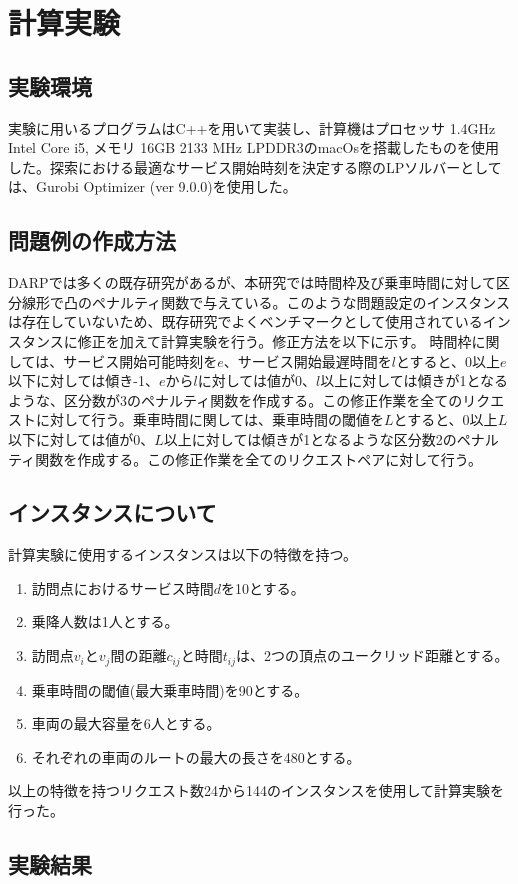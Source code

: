 \chapter{計算実験}\label{computational_result}
\section{実験環境}
実験に用いるプログラムはC++を用いて実装し、計算機はプロセッサ 1.4GHz Intel Core i5, メモリ 16GB 2133 MHz LPDDR3のmacOsを搭載したものを使用した。探索における最適なサービス開始時刻を決定する際のLPソルバーとしては、Gurobi Optimizer (ver 9.0.0)を使用した。

\section{問題例の作成方法}
DARPでは多くの既存研究があるが、本研究では時間枠及び乗車時間に対して区分線形で凸のペナルティ関数で与えている。このような問題設定のインスタンスは存在していないため、既存研究でよくベンチマークとして使用されているインスタンスに修正を加えて計算実験を行う。修正方法を以下に示す。
時間枠に関しては、サービス開始可能時刻を$e$、サービス開始最遅時間を$l$とすると、0以上$e$以下に対しては傾き-1、$e$から$l$に対しては値が0、$l$以上に対しては傾きが1となるような、区分数が3のペナルティ関数を作成する。この修正作業を全てのリクエストに対して行う。乗車時間に関しては、乗車時間の閾値を$L$とすると、0以上$L$以下に対しては値が0、$L$以上に対しては傾きが1となるような区分数2のペナルティ関数を作成する。この修正作業を全てのリクエストペアに対して行う。
\section{インスタンスについて}
計算実験に使用するインスタンスは以下の特徴を持つ。
\begin{enumerate}
 \item 訪問点におけるサービス時間$d$を10とする。
 \item 乗降人数は1人とする。
 \item 訪問点$v_i$と$v_j$間の距離$c_{ij}$と時間$t_{ij}$は、2つの頂点のユークリッド距離とする。
 \item 乗車時間の閾値(最大乗車時間)を90とする。
 \item 車両の最大容量を6人とする。
 \item それぞれの車両のルートの最大の長さを480とする。
\end{enumerate}
以上の特徴を持つリクエスト数24から144のインスタンスを使用して計算実験を行った。
\section{実験結果}
